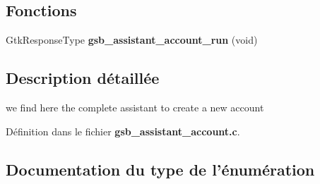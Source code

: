 \subsection*{Fonctions}
\begin{DoxyCompactItemize}
\item 
GtkResponseType {\bf gsb\_\-assistant\_\-account\_\-run} (void)
\end{DoxyCompactItemize}


\subsection{Description détaillée}
we find here the complete assistant to create a new account 

Définition dans le fichier {\bf gsb\_\-assistant\_\-account.c}.



\subsection{Documentation du type de l'énumération}
